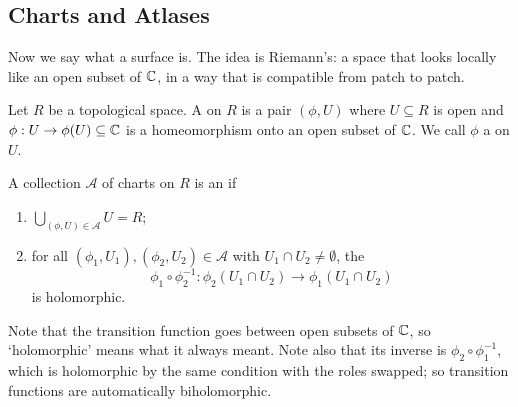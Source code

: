 \documentclass[a4paper]{scrartcl}
\begin{document}
\subsection{Charts and Atlases}

Now we say what a surface is. The idea is Riemann's: a space that looks locally like an
open subset of $\mathbb{C}$, in a way that is compatible from patch to patch.

\begin{definition}[Chart]
	Let $R$ be a topological space. A  on $R$ is a pair $(\phi, U)$ where
	$U \subseteq R$ is open and $\phi : U \to \phi(U) \subseteq \mathbb{C}$ is a homeomorphism
	onto an open subset of $\mathbb{C}$. We call $\phi$ a  on $U$.
\end{definition}

\begin{definition}[Atlas]
	A collection $\mathcal{A}$ of charts on $R$ is an  if
	\begin{enumerate}[label=(\roman*)]
		\item $\bigcup_{(\phi,U) \in \mathcal{A}} U = R$;
		\item for all $(\phi_1, U_1), (\phi_2, U_2) \in \mathcal{A}$ with
		$U_1 \cap U_2 \neq \emptyset$, the 
		$$
		\phi_1 \circ \phi_2^{-1} : \phi_2(U_1 \cap U_2) \to \phi_1(U_1 \cap U_2)
		$$
		is holomorphic.
	\end{enumerate}
\end{definition}

Note that the transition function goes between open subsets of $\mathbb{C}$, so `holomorphic'
means what it always meant. Note also that its inverse is $\phi_2 \circ \phi_1^{-1}$,
which is holomorphic by the same condition with the roles swapped; so transition functions
are automatically biholomorphic.
\end{document}
